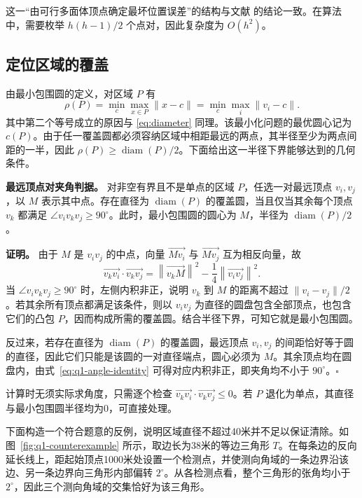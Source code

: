 \documentclass[UTF8,a4paper,zihao=-4,fontset=none]{ctexart}
\begin{document}
这一“由可行多面体顶点确定最坏位置误差”的结构与文献 \cite{Gholami2015} 的结论一致。在算法中，需要枚举 \(h(h-1)/2\) 个点对，因此复杂度为 \(O(h^2)\)。

\subsection{定位区域的覆盖}

由最小包围圆的定义，对区域 \(P\) 有
\begin{equation}
  \rho(P)=\min_c\max_{x\in P}\lVert x-c\rVert
  =\min_c\max_i\lVert v_i-c\rVert .
  \label{eq:mincircle}
\end{equation}
其中第二个等号成立的原因与 \eqref{eq:diameter} 同理。该最小化问题的最优圆心记为 \(c(P)\)。由于任一覆盖圆都必须容纳区域中相距最远的两点，其半径至少为两点间距的一半，因此 \(\rho(P)\ge\operatorname{diam}(P)/2\)。下面给出这一半径下界能够达到的几何条件。

\textbf{最远顶点对夹角判据。} 对非空有界且不是单点的区域 \(P\)，任选一对最远顶点 \(v_i,v_j\)，以 \(M\) 表示其中点。存在直径为 \(\operatorname{diam}(P)\) 的覆盖圆，当且仅当其余每个顶点 \(v_k\) 都满足 \(\angle v_i v_k v_j\ge90^\circ\)。此时，最小包围圆的圆心为 \(M\)，半径为 \(\operatorname{diam}(P)/2\)。

\textbf{证明。} 由于 \(M\) 是 \(v_iv_j\) 的中点，向量 \(\overrightarrow{Mv_i}\) 与 \(\overrightarrow{Mv_j}\) 互为相反向量，故
\begin{equation}
  \overrightarrow{v_kv_i}\cdot\overrightarrow{v_kv_j}
  =\left\lVert\overrightarrow{v_kM}\right\rVert^2
  -\frac14\left\lVert\overrightarrow{v_iv_j}\right\rVert^2.
  \label{eq:q1-angle-identity}
\end{equation}
当 \(\angle v_i v_k v_j\ge90^\circ\) 时，左侧内积非正，说明 \(v_k\) 到 \(M\) 的距离不超过 \(\lVert v_i-v_j\rVert/2\)。若其余所有顶点都满足该条件，则以 \(v_iv_j\) 为直径的圆盘包含全部顶点，也包含它们的凸包 \(P\)，因而构成所需的覆盖圆。结合半径下界，可知它就是最小包围圆。

反过来，若存在直径为 \(\operatorname{diam}(P)\) 的覆盖圆，最远顶点 \(v_i,v_j\) 的间距恰好等于圆的直径，因此它们只能是该圆的一对直径端点，圆心必须为 \(M\)。其余顶点均在圆盘内，由式~\eqref{eq:q1-angle-identity} 可得对应内积非正，即夹角均不小于 \(90^\circ\)。\(\square\)

计算时无须实际求角度，只需逐个检查 \(\overrightarrow{v_kv_i}\cdot\overrightarrow{v_kv_j}\le0\)。若 \(P\) 退化为单点，其直径与最小包围圆半径均为0，可直接处理。

下面构造一个符合题意的反例，说明区域直径不超过40米并不足以保证清除。如图~\ref{fig:q1-counterexample} 所示，取边长为38米的等边三角形 \(T\)。在每条边的反向延长线上，距起始顶点1000米处设置一个检测点，并使测向角域的一条边界沿该边、另一条边界向三角形内部偏转 \(2^\circ\)。从各检测点看，整个三角形的张角均小于 \(2^\circ\)，因此三个测向角域的交集恰好为该三角形。
\end{document}

